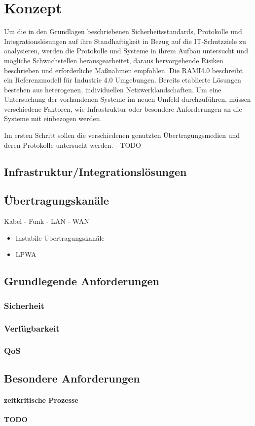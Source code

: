\chapter{Konzept}

Um die in den Grundlagen beschriebenen Sicherheitsstandards, Protokolle und Integrationslösungen auf ihre Standhaftigkeit in Bezug auf die IT-Schutzziele zu analysieren, werden die Protokolle und Systeme in ihrem Aufbau untersucht und mögliche Schwachstellen herausgearbeitet, daraus hervorgehende Risiken beschrieben und erforderliche Maßnahmen empfohlen. Die \ac{RAMI4.0} beschreibt ein Referenzmodell für Industrie 4.0 Umgebungen. Bereits etablierte Lösungen bestehen aus heterogenen, individuellen Netzwerklandschaften. Um eine Untersuchung der vorhandenen Systeme im neuen Umfeld durchzuführen, müssen verschiedene Faktoren, wie Infrastruktur oder besondere Anforderungen an die Systeme mit einbezogen werden.

Im ersten Schritt sollen die verschiedenen genutzten Übertragungsmedien und deren Protokolle untersucht werden. - TODO

\section{Infrastruktur/Integrationslösungen}

\section{Übertragungskanäle}
Kabel - Funk - LAN - WAN
\begin{itemize}
    \item Instabile Übertragungskanäle
    \item \ac{LPWA}
\end{itemize}

\section{Grundlegende Anforderungen}
\subsection{Sicherheit}
\subsection{Verfügbarkeit}
\subsection{QoS}

\section{Besondere Anforderungen}
\subsubsection{zeitkritische Prozesse}
\subsubsection{TODO}
